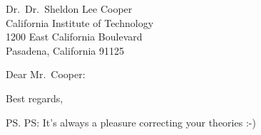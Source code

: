 \documentclass[
  english,            %
]{tumletter}
\begin{document}
\begin{letter}{Dr.\@~Dr.\@\ Sheldon Lee Cooper\\
    California Institute of Technology\\
    1200 East California Boulevard\\
    Pasadena, California 91125}

  \opening{Dear Mr.\@\ Cooper:}

  \lipsum[1]

  \closing{Best regards,}

  \ps PS: It's always a pleasure correcting your theories :-)

\end{letter}
\end{document}
